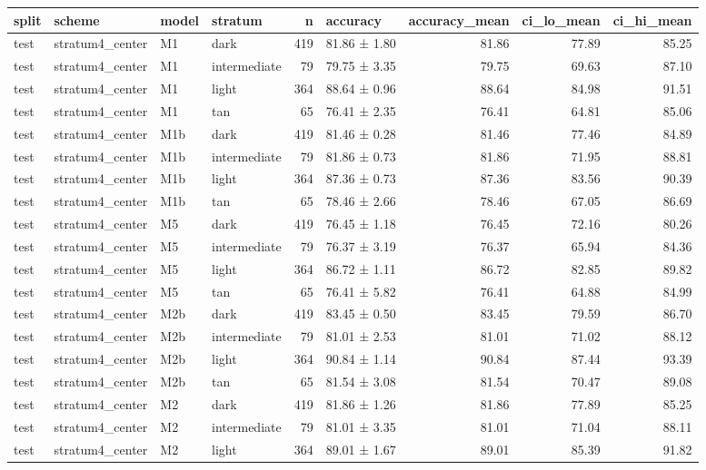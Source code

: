 \begin{tabular}{llllrlrrr}
\toprule
split & scheme & model & stratum & n & accuracy & accuracy\_mean & ci\_lo\_mean & ci\_hi\_mean \\
\midrule
test & stratum4\_center & M1 & dark & 419 & 81.86 ± 1.80 & 81.86 & 77.89 & 85.25 \\
test & stratum4\_center & M1 & intermediate & 79 & 79.75 ± 3.35 & 79.75 & 69.63 & 87.10 \\
test & stratum4\_center & M1 & light & 364 & 88.64 ± 0.96 & 88.64 & 84.98 & 91.51 \\
test & stratum4\_center & M1 & tan & 65 & 76.41 ± 2.35 & 76.41 & 64.81 & 85.06 \\
test & stratum4\_center & M1b & dark & 419 & 81.46 ± 0.28 & 81.46 & 77.46 & 84.89 \\
test & stratum4\_center & M1b & intermediate & 79 & 81.86 ± 0.73 & 81.86 & 71.95 & 88.81 \\
test & stratum4\_center & M1b & light & 364 & 87.36 ± 0.73 & 87.36 & 83.56 & 90.39 \\
test & stratum4\_center & M1b & tan & 65 & 78.46 ± 2.66 & 78.46 & 67.05 & 86.69 \\
test & stratum4\_center & M5 & dark & 419 & 76.45 ± 1.18 & 76.45 & 72.16 & 80.26 \\
test & stratum4\_center & M5 & intermediate & 79 & 76.37 ± 3.19 & 76.37 & 65.94 & 84.36 \\
test & stratum4\_center & M5 & light & 364 & 86.72 ± 1.11 & 86.72 & 82.85 & 89.82 \\
test & stratum4\_center & M5 & tan & 65 & 76.41 ± 5.82 & 76.41 & 64.88 & 84.99 \\
test & stratum4\_center & M2b & dark & 419 & 83.45 ± 0.50 & 83.45 & 79.59 & 86.70 \\
test & stratum4\_center & M2b & intermediate & 79 & 81.01 ± 2.53 & 81.01 & 71.02 & 88.12 \\
test & stratum4\_center & M2b & light & 364 & 90.84 ± 1.14 & 90.84 & 87.44 & 93.39 \\
test & stratum4\_center & M2b & tan & 65 & 81.54 ± 3.08 & 81.54 & 70.47 & 89.08 \\
test & stratum4\_center & M2 & dark & 419 & 81.86 ± 1.26 & 81.86 & 77.89 & 85.25 \\
test & stratum4\_center & M2 & intermediate & 79 & 81.01 ± 3.35 & 81.01 & 71.04 & 88.11 \\
test & stratum4\_center & M2 & light & 364 & 89.01 ± 1.67 & 89.01 & 85.39 & 91.82 \\

\end{tabular}
